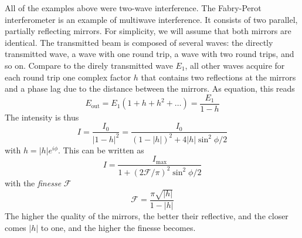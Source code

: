 All of the examples above were two-wave interference. The Fabry-Perot interferometer is an example of multiwave interference. It consists of two parallel, partially reflecting mirrors. For simplicity, we will assume that both mirrors are identical. The transmitted beam is composed of several waves: the directly transmitted wave, a wave with one round trip, a wave with two round trips, and so on. Compare to the direly transmitted wave $E_1$, all other waves acquire for each round trip one complex factor $h$ that contains two reflections at the mirrors and a phase lag due to the distance between the mirrors.
As equation, this reads
\begin{equation}
  E_\text{out} = E_1 \left( 1 + h + h^2 + \dots  \right) = \frac{ E_1 }{1 - h}
\end{equation}
The intensity is thus
\begin{equation}
  I = \frac{I_0}{| 1 - h |^2} = \frac{I_0}{(1 - |h|)^2 + 4 |h| \sin^2 \phi/2}
\end{equation}
with $h = |h| e^{i \phi}$. This can be written as
\begin{equation}
  I = \frac{I_\text{max}}{1 + (2 \mathcal{F}/ \pi)^2  \sin^2 \phi/2}
\end{equation}
with the \emph{finesse} $\mathcal{F}$
\begin{equation}
  \mathcal{F} = \frac{\pi \sqrt{|h|}}{1 - |h|}
\end{equation}
The higher the quality of the mirrors, the better their reflective, and the closer comes $|h|$ to one, and the higher the finesse becomes.


